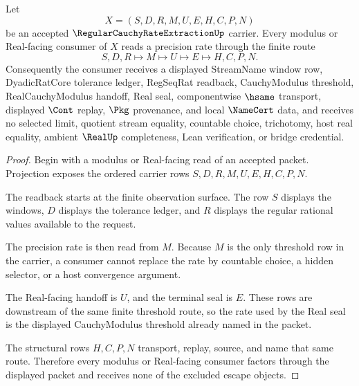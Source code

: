 \begin{theorem}
\label{thm:regular-cauchy-rate-extraction-modulus-readback}
Let
$$
X=(S,D,R,M,U,E,H,C,P,N)
$$
be an accepted $\RegularCauchyRateExtractionUp$ carrier. Every modulus or Real-facing consumer of $X$ reads a precision rate through the finite route
$$
S,D,R \longmapsto M \longmapsto U \longmapsto E \longmapsto H,C,P,N .
$$
Consequently the consumer receives a displayed StreamName window row, DyadicRatCore tolerance ledger, RegSeqRat readback, CauchyModulus threshold, RealCauchyModulus handoff, Real seal, componentwise $\hsame$ transport, displayed $\Cont$ replay, $\Pkg$ provenance, and local $\NameCert$ data, and receives no selected limit, quotient stream equality, countable choice, trichotomy, host real equality, ambient $\RealUp$ completeness, Lean verification, or bridge credential.
\end{theorem}
\begin{proof}
Begin with a modulus or Real-facing read of an accepted packet. Projection exposes the ordered carrier rows $S,D,R,M,U,E,H,C,P,N$.

The readback starts at the finite observation surface. The row $S$ displays the windows, $D$ displays the tolerance ledger, and $R$ displays the regular rational values available to the request.

The precision rate is then read from $M$. Because $M$ is the only threshold row in the carrier, a consumer cannot replace the rate by countable choice, a hidden selector, or a host convergence argument.

The Real-facing handoff is $U$, and the terminal seal is $E$. These rows are downstream of the same finite threshold route, so the rate used by the Real seal is the displayed CauchyModulus threshold already named in the packet.

The structural rows $H,C,P,N$ transport, replay, source, and name that same route. Therefore every modulus or Real-facing consumer factors through the displayed packet and receives none of the excluded escape objects.
\end{proof}

